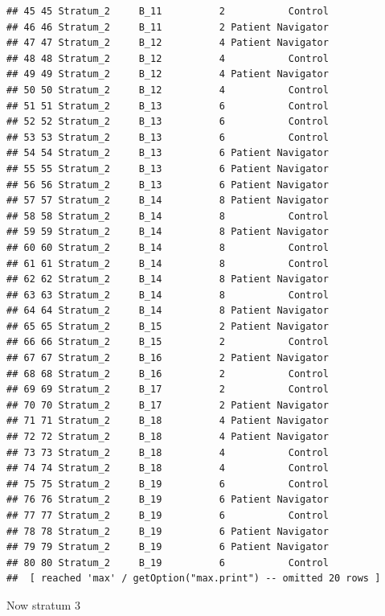 \documentclass[
]{book}
\newenvironment{Shaded}{\begin{snugshade}}{\end{snugshade}}
\newcommand{\DataTypeTok}[1]{\textcolor[rgb]{0.13,0.29,0.53}{#1}}
\newcommand{\DecValTok}[1]{\textcolor[rgb]{0.00,0.00,0.81}{#1}}
\newcommand{\KeywordTok}[1]{\textcolor[rgb]{0.13,0.29,0.53}{\textbf{#1}}}
\newcommand{\NormalTok}[1]{#1}
\newcommand{\OperatorTok}[1]{\textcolor[rgb]{0.81,0.36,0.00}{\textbf{#1}}}
\newcommand{\StringTok}[1]{\textcolor[rgb]{0.31,0.60,0.02}{#1}}
\begin{document}
\begin{verbatim}
## 45 45 Stratum_2     B_11          2           Control
## 46 46 Stratum_2     B_11          2 Patient Navigator
## 47 47 Stratum_2     B_12          4 Patient Navigator
## 48 48 Stratum_2     B_12          4           Control
## 49 49 Stratum_2     B_12          4 Patient Navigator
## 50 50 Stratum_2     B_12          4           Control
## 51 51 Stratum_2     B_13          6           Control
## 52 52 Stratum_2     B_13          6           Control
## 53 53 Stratum_2     B_13          6           Control
## 54 54 Stratum_2     B_13          6 Patient Navigator
## 55 55 Stratum_2     B_13          6 Patient Navigator
## 56 56 Stratum_2     B_13          6 Patient Navigator
## 57 57 Stratum_2     B_14          8 Patient Navigator
## 58 58 Stratum_2     B_14          8           Control
## 59 59 Stratum_2     B_14          8 Patient Navigator
## 60 60 Stratum_2     B_14          8           Control
## 61 61 Stratum_2     B_14          8           Control
## 62 62 Stratum_2     B_14          8 Patient Navigator
## 63 63 Stratum_2     B_14          8           Control
## 64 64 Stratum_2     B_14          8 Patient Navigator
## 65 65 Stratum_2     B_15          2 Patient Navigator
## 66 66 Stratum_2     B_15          2           Control
## 67 67 Stratum_2     B_16          2 Patient Navigator
## 68 68 Stratum_2     B_16          2           Control
## 69 69 Stratum_2     B_17          2           Control
## 70 70 Stratum_2     B_17          2 Patient Navigator
## 71 71 Stratum_2     B_18          4 Patient Navigator
## 72 72 Stratum_2     B_18          4 Patient Navigator
## 73 73 Stratum_2     B_18          4           Control
## 74 74 Stratum_2     B_18          4           Control
## 75 75 Stratum_2     B_19          6           Control
## 76 76 Stratum_2     B_19          6 Patient Navigator
## 77 77 Stratum_2     B_19          6           Control
## 78 78 Stratum_2     B_19          6 Patient Navigator
## 79 79 Stratum_2     B_19          6 Patient Navigator
## 80 80 Stratum_2     B_19          6           Control
##  [ reached 'max' / getOption("max.print") -- omitted 20 rows ]
\end{verbatim}

Now stratum 3

\begin{Shaded}
\end{Shaded}
\end{document}
